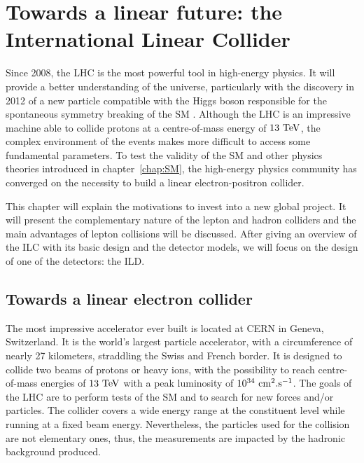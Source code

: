 \chapter{Towards a linear future: the International Linear Collider}
\label{chap:ILC}

  Since 2008, the \gls{LHC} is the most powerful tool in high-energy physics.
  It will provide a better understanding of the universe, particularly with the discovery in 2012 of a new particle compatible with the Higgs boson responsible for the spontaneous symmetry breaking of the \acrfull{SM} \cite{Aad2012, Chatrchyan2012}.
  Although the \gls{LHC} is an impressive machine able to collide protons at a centre-of-mass energy of $13~\rm{TeV}$, the complex environment of the events makes more difficult to access some fundamental parameters. 
  To test the validity of the \gls{SM} and other physics theories introduced in chapter~\ref{chap:SM}, the high-energy physics community has converged on the necessity to build a linear electron-positron collider.
  
  This chapter will explain the motivations to invest into a new global project. 
  It will present the complementary nature of the lepton and hadron colliders and the main advantages of lepton collisions will be discussed.
  After giving an overview of the \gls{ILC} with its basic design and the detector models, we will focus on the design of one of the detectors: the \gls{ILD}.

 \minitoc
  
  \section{Towards a linear electron collider}
 
  The most impressive accelerator ever built is located at \gls{CERN} in Geneva, Switzerland. 
  It is the world's largest particle accelerator, with a circumference of nearly 27 kilometers, straddling the Swiss and French border.
  It is designed to collide two beams of protons or heavy ions, with the possibility to reach centre-of-mass energies of $13~\rm{TeV}$ with a peak luminosity of $10^{34}~\rm{cm}^2\rm{.s}^{-1}$.
  The goals of the \gls{LHC} are to perform tests of the \gls{SM} and to search for new forces and/or particles. 
  The collider covers a wide energy range at the constituent level while running at a fixed beam energy.
  Nevertheless, the particles used for the collision are not elementary ones, thus, the measurements are impacted by the hadronic background produced.
  
